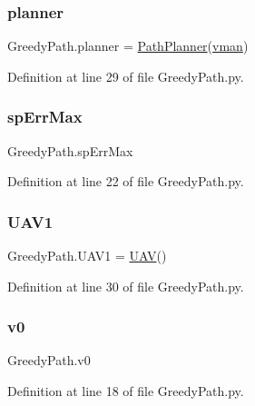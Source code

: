 \subsubsection{\texorpdfstring{planner}{planner}}
{\footnotesize\ttfamily Greedy\+Path.\+planner = \mbox{\hyperlink{classpath_plan_1_1_path_planner}{Path\+Planner}}(\mbox{\hyperlink{namespace_greedy_path_a0b686e13d9e46e185e611dc0b5d92e8f}{vman}})}



Definition at line 29 of file Greedy\+Path.\+py.

\mbox{\label{namespace_greedy_path_ac15dd3310629c8a8e6be44d3a182f356}} 
\subsubsection{\texorpdfstring{sp\+Err\+Max}{spErrMax}}
{\footnotesize\ttfamily Greedy\+Path.\+sp\+Err\+Max}



Definition at line 22 of file Greedy\+Path.\+py.

\mbox{\label{namespace_greedy_path_a133ae9f113d9f694f9506cb6bad87f91}} 
\subsubsection{\texorpdfstring{U\+A\+V1}{UAV1}}
{\footnotesize\ttfamily Greedy\+Path.\+U\+A\+V1 = \mbox{\hyperlink{classpath_plan_1_1_u_a_v}{U\+AV}}()}



Definition at line 30 of file Greedy\+Path.\+py.

\mbox{\label{namespace_greedy_path_ac3503601b08d4fc59e5cbc91d32492f0}} 
\subsubsection{\texorpdfstring{v0}{v0}}
{\footnotesize\ttfamily Greedy\+Path.\+v0}



Definition at line 18 of file Greedy\+Path.\+py.


